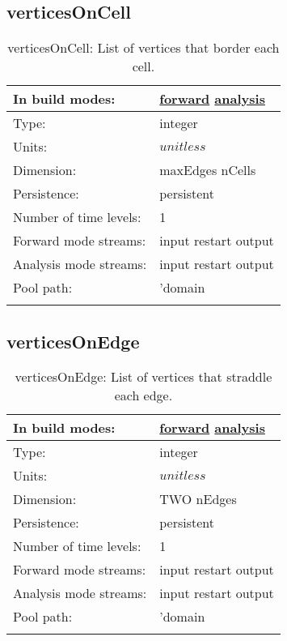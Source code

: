 \subsection[verticesOnCell]{verticesOnCell}
\label{subsec:var_sec_mesh_verticesOnCell}
\begin{center}
\begin{longtable}{| p{2.0in} | p{4.0in} |}
        \hline 
        In build modes: & \hyperref[subsec:forward_var_tab_mesh]{forward} \hyperref[subsec:analysis_var_tab_mesh]{analysis} \\
        \hline 
        Type: & integer \\
        \hline 
        Units: & $unitless$ \\
        \hline 
        Dimension: & maxEdges nCells \\
        \hline 
        Persistence: & persistent \\
        \hline 
        Number of time levels: & 1 \\
        \hline 
		 Forward mode streams: &  input restart output \\
        \hline 
		 Analysis mode streams: &  input restart output \\
        \hline 
            Pool path: & 'domain %
 \\
		 \hline 
    \caption{verticesOnCell: List of vertices that border each cell.}
\end{longtable}
\end{center}
\subsection[verticesOnEdge]{verticesOnEdge}
\label{subsec:var_sec_mesh_verticesOnEdge}
\begin{center}
\begin{longtable}{| p{2.0in} | p{4.0in} |}
        \hline 
        In build modes: & \hyperref[subsec:forward_var_tab_mesh]{forward} \hyperref[subsec:analysis_var_tab_mesh]{analysis} \\
        \hline 
        Type: & integer \\
        \hline 
        Units: & $unitless$ \\
        \hline 
        Dimension: & TWO nEdges \\
        \hline 
        Persistence: & persistent \\
        \hline 
        Number of time levels: & 1 \\
        \hline 
		 Forward mode streams: &  input restart output \\
        \hline 
		 Analysis mode streams: &  input restart output \\
        \hline 
            Pool path: & 'domain %
 \\
		 \hline 
    \caption{verticesOnEdge: List of vertices that straddle each edge.}
\end{longtable}
\end{center}

